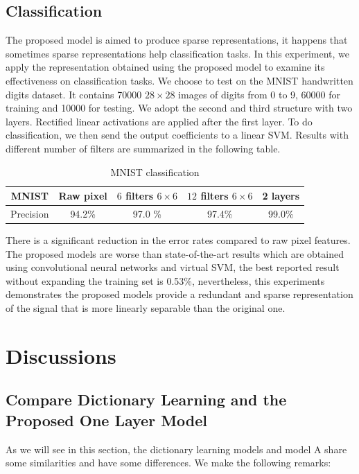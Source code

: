 \documentclass[a4paper]{article}
\begin{document}
\subsection{Classification}
The proposed model is aimed to produce sparse representations, it happens that sometimes sparse representations help classification tasks. In this experiment, we apply the representation obtained using the proposed model to examine its effectiveness on classification tasks. We choose to test on the MNIST handwritten digits dataset. It contains 70000 $28\times 28$ images of digits from 0 to 9, 60000 for training and 10000 for testing. We adopt the second and third structure with two layers. Rectified linear activations are applied after the first layer. To do classification, we then send the output coefficients to a linear SVM.  Results with different number of filters are summarized in the following table.
\begin{table}[h!]
\centering
\begin{tabular}{c c c c c}
\hline
MNIST & Raw pixel & $6$ filters $6\times 6$ & $12$ filters $6\times 6$& 2 layers \\
\hline
Precision & 94.2\% & 97.0 \% & 97.4\% & 99.0\% \\
\hline
\end{tabular}
\caption{MNIST classification}
\end{table}
There is a significant reduction in the error rates compared to raw pixel features. The proposed models are worse than state-of-the-art results which are obtained using convolutional neural networks and virtual SVM, the best reported result without expanding the training set is 0.53\%, nevertheless, this experiments demonstrates the proposed models provide a redundant and sparse representation of the signal that is more linearly separable than the original one.

\section{Discussions}
\subsection{Compare Dictionary Learning and the Proposed One Layer Model}
As we will see in this section, the dictionary learning models and model A share some similarities and have some differences. We make the following remarks: 
\end{document}
